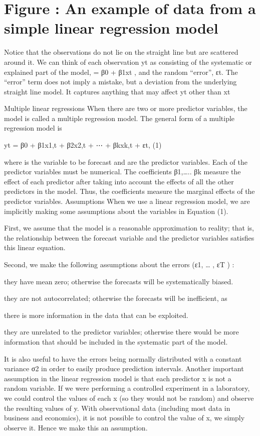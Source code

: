 \documentclass[
  authoryear,
  preprint,
  3p]{elsarticle}
\begin{document}
\hypertarget{figure-an-example-of-data-from-a-simple-linear-regression-model}{%
\section{Figure : An example of data from a simple linear regression
model}\label{figure-an-example-of-data-from-a-simple-linear-regression-model}}

Notice that the observations do not lie on the straight line but are
scattered around it. We can think of each observation yt as consisting
of the systematic or explained part of the model, = β0 + β1xt , and the
random ``error'', εt. The ``error'' term does not imply a mistake, but a
deviation from the underlying straight line model. It captures anything
that may affect yt other than xt

Multiple linear regressions When there are two or more predictor
variables, the model is called a multiple regression model. The general
form of a multiple regression model is

yt = β0 + β1x1,t + β2x2,t + ⋯ + βkxk,t + εt, (1)

where is the variable to be forecast and are the predictor variables.
Each of the predictor variables must be numerical. The coefficients
β1,\ldots.. βk measure the effect of each predictor after taking into
account the effects of all the other predictors in the model. Thus, the
coefficients measure the marginal effects of the predictor variables.
Assumptions When we use a linear regression model, we are implicitly
making some assumptions about the variables in Equation (1).

First, we assume that the model is a reasonable approximation to
reality; that is, the relationship between the forecast variable and the
predictor variables satisfies this linear equation.

Second, we make the following assumptions about the errors (ε1, \ldots{}
, εT ) :

they have mean zero; otherwise the forecasts will be systematically
biased.

they are not autocorrelated; otherwise the forecasts will be
inefficient, as

there is more information in the data that can be exploited.

they are unrelated to the predictor variables; otherwise there would be
more information that should be included in the systematic part of the
model.

It is also useful to have the errors being normally distributed with a
constant variance σ2 in order to easily produce prediction intervals.
Another important assumption in the linear regression model is that each
predictor x is not a random variable. If we were performing a controlled
experiment in a laboratory, we could control the values of each x (so
they would not be random) and observe the resulting values of y. With
observational data (including most data in business and economics), it
is not possible to control the value of x, we simply observe it. Hence
we make this an assumption.
\end{document}
